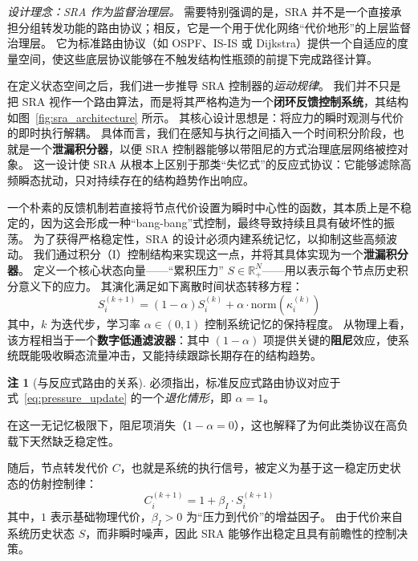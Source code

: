 \documentclass[journal]{IEEEtran}
\theoremstyle{plain}
\theoremstyle{definition}
\newtheorem{remark}{注}
\begin{document}
\textit{设计理念：SRA 作为监督治理层。}
需要特别强调的是，SRA 并不是一个直接承担分组转发功能的路由协议；相反，它是一个用于优化网络“代价地形”的上层监督治理层。
它为标准路由协议（如 OSPF、IS-IS 或 Dijkstra）提供一个自适应的度量空间，使这些底层协议能够在不触发结构性瓶颈的前提下完成路径计算。

在定义状态空间之后，我们进一步推导 SRA 控制器的\textit{运动规律}。
我们并不只是把 SRA 视作一个路由算法，而是将其严格构造为一个\textbf{闭环反馈控制系统}，其结构如图~\ref{fig:sra_architecture} 所示。
其核心设计思想是：将应力的瞬时观测与代价的即时执行解耦。
具体而言，我们在感知与执行之间插入一个时间积分阶段，也就是一个\textbf{泄漏积分器}，以便 SRA 控制器能够以带阻尼的方式治理底层网络被控对象。
这一设计使 SRA 从根本上区别于那类“失忆式”的反应式协议：它能够滤除高频瞬态扰动，只对持续存在的结构趋势作出响应。

一个朴素的反馈机制若直接将节点代价设置为瞬时中心性的函数，其本质上是不稳定的，因为这会形成一种“bang-bang”式控制，最终导致持续且具有破坏性的振荡。
为了获得严格稳定性，SRA 的设计必须内建系统记忆，以抑制这些高频波动。
我们通过积分（I）控制结构来实现这一点，并将其具体实现为一个\textbf{泄漏积分器}。
定义一个核心状态向量——“累积压力” $S \in \mathbb{R}^N_+$——用以表示每个节点历史积分意义下的应力。
其演化满足如下离散时间状态转移方程：
\begin{equation}
    \label{eq:pressure_update}
    S_i^{(k+1)} = (1 - \alpha) S_i^{(k)} + \alpha \cdot \mathrm{norm}(\kappa_i^{(k)})
\end{equation}
其中，$k$ 为迭代步，学习率 $\alpha \in (0,1)$ 控制系统记忆的保持程度。
从物理上看，该方程相当于一个\textbf{数字低通滤波器}：其中 $(1-\alpha)$ 项提供关键的\textbf{阻尼}效应，使系统既能吸收瞬态流量冲击，又能持续跟踪长期存在的结构趋势。

\begin{remark}[与反应式路由的关系]
\label{rem:reactive_routing}
必须指出，标准反应式路由协议对应于式~\eqref{eq:pressure_update} 的一个\textit{退化情形}，即 $\alpha=1$。
\end{remark}

在这一无记忆极限下，阻尼项消失（$1-\alpha=0$），这也解释了为何此类协议在高负载下天然缺乏稳定性。

随后，节点转发代价 $C$，也就是系统的执行信号，被定义为基于这一稳定历史状态的仿射控制律：
\begin{equation}
    \label{eq:cost_update}
    C_i^{(k+1)} = 1 + \beta_I \cdot S_i^{(k+1)}
\end{equation}
其中，$1$ 表示基础物理代价，$\beta_I > 0$ 为“压力到代价”的增益因子。
由于代价来自系统历史状态 $S$，而非瞬时噪声，因此 SRA 能够作出稳定且具有前瞻性的控制决策。
\end{document}
